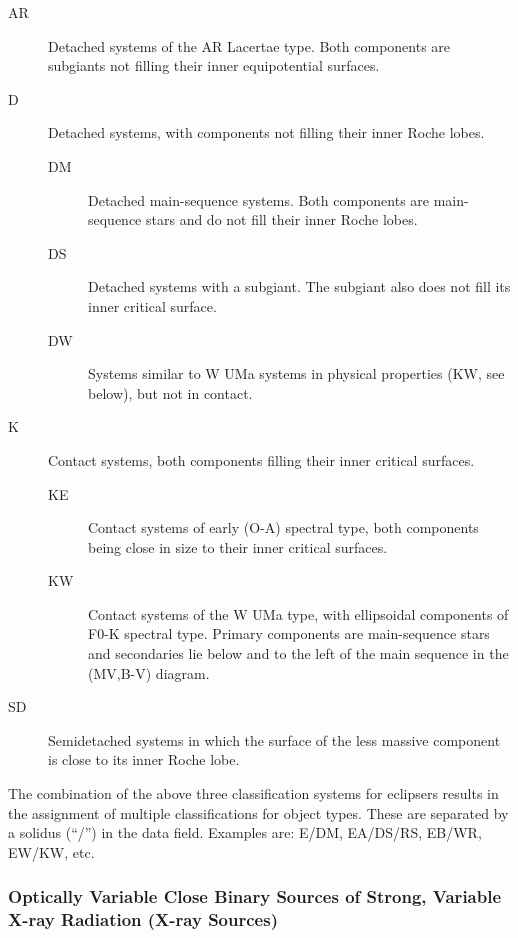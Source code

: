 \begin{description}
\item[AR]     Detached systems of the AR Lacertae type. Both components
              are subgiants not filling their inner equipotential surfaces.
\item[D]      Detached systems, with components not filling their inner Roche lobes.
	\begin{description}
\item[DM]     Detached main-sequence systems. Both components are
              main-sequence stars and do not fill their inner Roche lobes.
\item[DS]     Detached systems with a subgiant. The subgiant also does
              not fill its inner critical surface.
\item[DW]     Systems similar to W UMa systems in physical properties (KW, see below), but not in contact.
	\end{description}
\item[K]      Contact systems, both components filling their inner critical surfaces.
	\begin{description}
\item[KE]     Contact systems of early (O-A) spectral type, both
              components being close in size to their inner critical surfaces.
\item[KW]     Contact systems of the W UMa type, with ellipsoidal
              components of F0-K spectral type. Primary components are main-sequence
              stars and secondaries lie below and to the left of the main sequence in the (MV,B-V) diagram.
	\end{description}
\item[SD]     Semidetached systems in which the surface of the less
              massive component is close to its inner Roche lobe.
\end{description}

The combination of the above three classification systems for eclipsers
results in the assignment of multiple classifications for object types.
These are separated by a solidus (``/'') in the data field. Examples are:
E/DM, EA/DS/RS, EB/WR, EW/KW, etc.

\subsubsection{Optically Variable Close Binary Sources of Strong, Variable X-ray Radiation (X-ray Sources)}
\label{optically-variable-close-binary-sources-of-strong-variable-x-ray-radiation-x-ray-sources}

